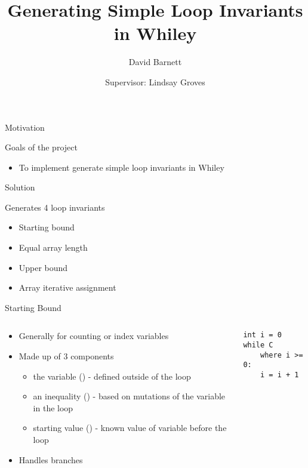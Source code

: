 

\title{Generating Simple Loop Invariants in Whiley}
\author{David Barnett}
\date{Supervisor: Lindsay Groves}


\frame{\titlepage}


\begin{frame}{Motivation}

Goals of the project
\begin{itemize}
\item{To implement generate simple loop invariants in Whiley}
\end{itemize}

\end{frame}



\begin{frame}{Solution}

Generates 4 loop invariants

\begin{itemize}
\item Starting bound
\item Equal array length
\item Upper bound
\item Array iterative assignment
\end{itemize}

\end{frame}

\begin{frame}[fragile]{Starting Bound}

\begin{columns}

\begin{column}{0.5\textwidth}
\begin{itemize}
\item Generally for counting or index variables
\item Made up of 3 components
\begin{itemize}
    \item the variable () - defined outside of the loop
    \item an inequality (\code{>=}) - based on mutations of the variable in the loop
    \item starting value () - known value of variable before the loop
\end{itemize}

\item Handles branches

\end{itemize}
\end{column}

\begin{column}{0.5\textwidth}
\begin{verbatim}
int i = 0
while C
    where i >= 0:
    i = i + 1
\end{verbatim}
\end{column}

\end{columns}

\end{frame}


